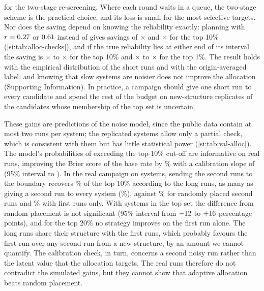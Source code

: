 \documentclass[journal=jcisd8,manuscript=article,email=true]{achemso}
\begin{document}
for the two-stage re-screening. Where each round waits in a queue, the two-stage scheme is the
practical choice, and its loss is small for the most selective targets. Nor does the saving depend on knowing the
reliability exactly: planning with $r=0.27$ or $0.61$ instead of \alRelTrue{} gives
savings of $\times$\alMisLoSavingTopTen{} and $\times$\alMisHiSavingTopTen{} for the top 10\%
(\cref{si:tab:alloc-checks}), and if the true reliability lies at either end of its interval the
saving is $\times$\alTrueLoSavingTopTen{} to $\times$\alTrueHiSavingTopTen{} for the top 10\% and
$\times$\alTrueLoSavingTopOne{} to $\times$\alTrueHiSavingTopOne{} for the top 1\%. The result holds with the empirical distribution of the
short runs and with the origin-averaged label, and knowing that slow systems are noisier does not
improve the allocation (Supporting Information). In practice, a campaign should give one short run to
every candidate and spend the rest of the budget on new-structure replicates of the candidates
whose membership of the top set is uncertain.

These gains are predictions of the noise model, since the public data contain at most two runs per
system; the replicated systems allow only a partial check, which is consistent with them but has
little statistical power (\cref{si:tab:val-alloc}). The
model's probabilities of exceeding the top-10\% cut-off are informative on real runs, improving the
Brier score of the base rate by \valAlBrierGainTen\% with a calibration slope of
\valAlCalSlopeTen{} (95\% interval \valAlCalSlopeLoTen{} to \valAlCalSlopeHiTen). In the real
campaign on \valAlNCamp{} systems, sending the \valAlExtra{} second runs to the boundary recovers
\valAlBoundTen\% of the top 10\% according to the long runs, as many as giving a second run to
every system (\valAlBothTen\%), against \valAlRandomTen\% for randomly placed second runs and
\valAlOnlyATen\% with first runs only. With \valAlKTen{} systems in the top set the difference from
random placement is not significant (95\% interval from $-12$ to
$+16$ percentage points), and for the top 20\% no strategy improves on the first run
alone. The long runs share their structure with the first runs, which probably favours the first
run over any second run from a new structure, by an amount we cannot quantify. The calibration
check, in turn, concerns a second noisy run rather than the latent value that the allocation
targets. The real runs therefore do not contradict the simulated gains, but they cannot show that
adaptive allocation beats random placement.
\end{document}
